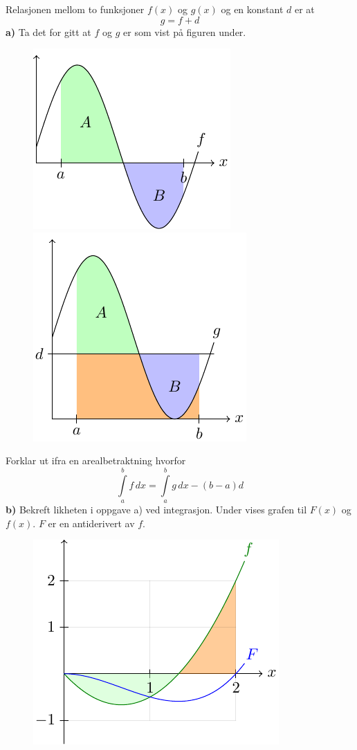 \nes
{}
Relasjonen mellom to funksjoner $ f(x) $ og $ g(x) $ og en konstant $ d $ er at
\[ g=f+d \]
\textbf{a)} Ta det for gitt at $ f $ og $ g $ er som vist på figuren under.
\begin{figure}
\centering
\includegraphics[scale=0.9]{../../asymptote/int6a}\quad
\includegraphics[scale=0.9]{../../asymptote/int6b}
\end{figure}
Forklar ut ifra en arealbetraktning hvorfor\[ \int\limits_a^b f \,dx=\int\limits_a^b g\,dx -(b-a)d  \]
\textbf{b)} Bekreft likheten i oppgave a) ved integrasjon.
\newpage
{}
Under vises grafen til $ F(x) $ og $ f(x) $. $ F $ er en antiderivert av $ f $.
\begin{figure}
	\centering
	\includegraphics[scale=0.9]{../../asymptote/faropg}\\
	\raggedright
\end{figure}


